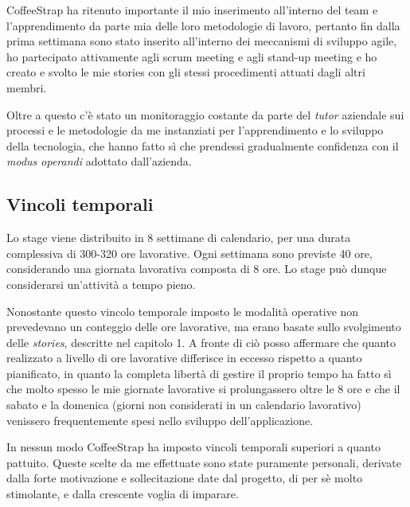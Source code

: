 CoffeeStrap ha ritenuto importante il mio inserimento all'interno del team e l'apprendimento da parte mia delle loro metodologie di lavoro, pertanto fin dalla prima settimana sono stato inserito all'interno dei meccanismi di sviluppo agile, ho partecipato attivamente agli scrum meeting e agli stand-up meeting e ho creato e svolto le mie stories con gli stessi procedimenti attuati dagli altri membri. 

Oltre a questo c'è stato un monitoraggio costante da parte del \textit{tutor} aziendale sui processi e le metodologie da me instanziati per l'apprendimento e lo sviluppo della tecnologia, che hanno fatto sì che prendessi gradualmente confidenza con il \textit{modus operandi} adottato dall'azienda.

\subsection{Vincoli temporali}

Lo stage viene distribuito in 8 settimane di calendario, per una durata complessiva di 300-320 ore lavorative. Ogni settimana sono previste 40 ore, considerando una giornata lavorativa composta di 8 ore. Lo stage può dunque considerarsi un'attività a tempo pieno.

Nonostante questo vincolo temporale imposto le modalità operative non prevedevano un conteggio delle ore lavorative, ma erano basate sullo svolgimento delle \textit{stories}, descritte nel capitolo 1. A fronte di ciò posso affermare che quanto realizzato a livello di ore lavorative differisce in eccesso rispetto a quanto pianificato, in quanto la completa libertà di gestire il proprio tempo ha fatto sì che molto spesso le mie giornate lavorative si prolungassero oltre le 8 ore e che il sabato e la domenica (giorni non considerati in un calendario lavorativo) venissero frequentemente spesi nello sviluppo dell'applicazione.

In nessun modo CoffeeStrap ha imposto vincoli temporali superiori a quanto pattuito. Queste scelte da me effettuate sono state puramente personali, derivate dalla forte motivazione e sollecitazione date dal progetto, di per sè molto stimolante, e dalla crescente voglia di imparare.